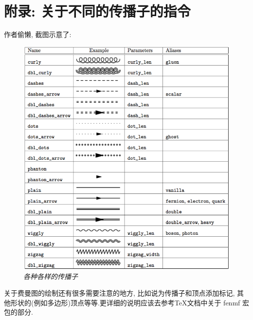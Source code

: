 \documentclass{article}
\begin{document}
\section{附录: 关于不同的传播子的指令}
作者偷懒, 截图示意了:
\begin{figure}[!htp]
\centering
\includegraphics[width=15cm]{propagator.png}
\caption{\emph{各种各样的传播子}}
\end{figure}

关于费曼图的绘制还有很多需要注意的地方, 比如说为传播子和顶点添加标记, 其他形状的(例如多边形)顶点等等.更详细的说明应该去参考\TeX 文档中关于 fenmf 宏包的部分.
\end{document}
